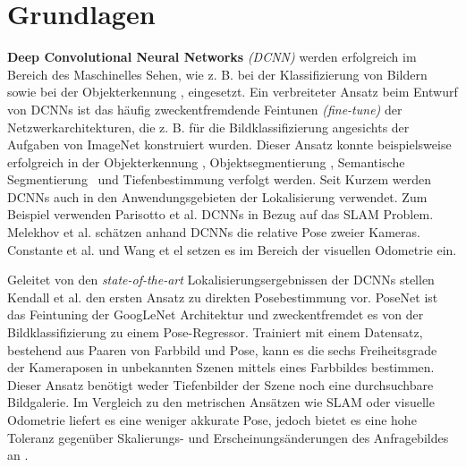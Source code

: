\pagebreak
\section{Grundlagen}




\pagebreak
\textbf{Deep Convolutional Neural Networks} \textit{(DCNN)} werden erfolgreich im Bereich des Maschinelles Sehen, wie z. B. bei der Klassifizierung von Bildern \cite{krizhevskyImageNetClassificationDeep2012, simonyanVeryDeepConvolutional2014, heDeepResidualLearning2015} sowie bei der  Objekterkennung \cite{girshickRichFeatureHierarchies2013, renFasterRCNNRealTime2015b, girshickFastRCNN2015},  eingesetzt. 
Ein verbreiteter Ansatz beim Entwurf von DCNNs ist das häufig zweckentfremdende Feintunen \textit{(fine-tune)} der Netzwerkarchitekturen, die z. B. für die Bildklassifizierung angesichts der Aufgaben von ImageNet \cite{russakovskyImageNetLargeScale2014} konstruiert wurden. Dieser Ansatz konnte beispielsweise erfolgreich in der Objekterkennung \cite{girshickFastRCNN2015}, Objektsegmentierung \cite{kokkinosPushingBoundariesBoundary2015, maninisConvolutionalOrientedBoundaries2016}, Semantische Segmentierung \cite{nohLearningDeconvolutionNetwork2015, hazirbasFuseNetIncorporatingDepth2017a} und Tiefenbestimmung \cite{liDepthSurfaceNormal2015} verfolgt werden.
Seit Kurzem werden DCNNs auch in den Anwendungsgebieten der Lokalisierung verwendet. Zum Beispiel verwenden Parisotto et al. \cite{parisottoGlobalPoseEstimation2018} DCNNs in Bezug auf das SLAM Problem. Melekhov et al. \cite{melekhovRelativeCameraPose2017} schätzen anhand DCNNs die relative Pose zweier Kameras. Constante et al.  \cite{costanteExploringRepresentationLearning2016} und Wang et el \cite{wangDeepVOEndtoendVisual2017} setzen es im Bereich der visuellen Odometrie ein.

Geleitet von den \textit{state-of-the-art} Lokalisierungsergebnissen der DCNNs stellen Kendall et al. \cite{kendallPoseNetConvolutionalNetwork2015} den ersten Ansatz zu direkten Posebestimmung  vor.
PoseNet \cite{kendallPoseNetConvolutionalNetwork2015} ist das Feintuning der GoogLeNet \cite{szegedyGoingDeeperConvolutions2015} Architektur und zweckentfremdet es von der Bildklassifizierung zu einem Pose-Regressor. Trainiert mit einem Datensatz, bestehend aus Paaren von Farbbild und Pose, kann es die sechs Freiheitsgrade der Kameraposen in unbekannten Szenen mittels eines Farbbildes bestimmen. Dieser Ansatz benötigt weder Tiefenbilder der Szene noch eine durchsuchbare Bildgalerie. Im Vergleich zu den metrischen Ansätzen wie SLAM oder visuelle Odometrie liefert es eine weniger akkurate Pose, jedoch bietet es eine hohe Toleranz gegenüber Skalierungs- und Erscheinungsänderungen des Anfragebildes an \cite{piascoSurveyVisualBasedLocalization2018}.


